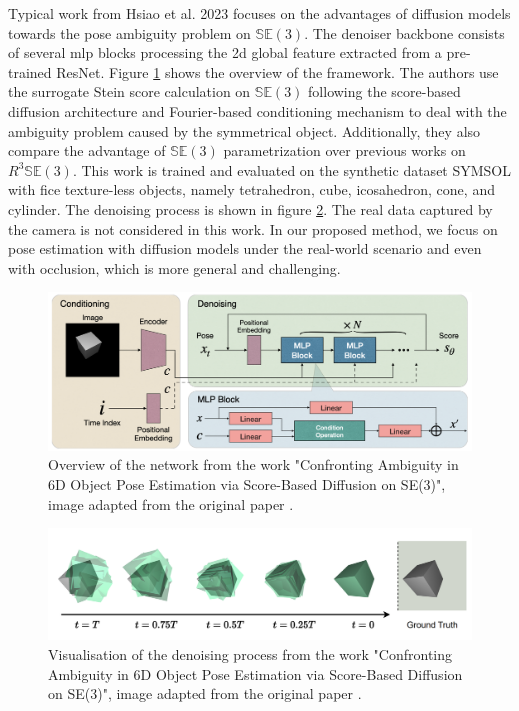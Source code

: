 \documentclass[12pt,DIV14,BCOR12mm,a4paper,footinclude=false,headinclude,parskip=half-,twoside,openright,cleardoublepage=empty,toc=index,bibliography=totoc,listof=totoc]{scrreprt}
\numberwithin{equation}{chapter}
\begin{document}
Typical work from Hsiao et al. 2023 \cite{hsiao2023confronting} focuses on the advantages of diffusion models towards the pose ambiguity problem on $\mathbb{SE}(3)$. The denoiser backbone consists of several \gls{mlp} blocks processing the \gls{2d} global feature extracted from a pre-trained ResNet. Figure \ref{img:confront} shows the overview of the framework. The authors use the surrogate Stein score calculation on $\mathbb{SE}(3)$ following the score-based diffusion architecture and Fourier-based conditioning mechanism to deal with the ambiguity problem caused by the symmetrical object. Additionally, they also compare the advantage of $\mathbb{SE}(3)$ parametrization over previous works on $R^{3}\mathbb{SE}(3)$. This work is trained and evaluated on the synthetic dataset SYMSOL \cite{implicitpdf2021} with fice texture-less objects, namely tetrahedron, cube, icosahedron, cone, and cylinder. The denoising process is shown in figure \ref{img:confront_cube}. The real data captured by the camera is not considered in this work. In our proposed method, we focus on pose estimation with diffusion models under the real-world scenario and even with occlusion, which is more general and challenging.
\begin{figure}[h]
	\centering
	\includegraphics[width=1.\textwidth]{img/confront.png}
	\caption{Overview of the network from the work "Confronting Ambiguity in 6D Object Pose Estimation via Score-Based Diffusion on SE(3)", image adapted from the original paper \cite{hsiao2023confronting}.}
	\label{img:confront}
\end{figure}

\begin{figure}[h]
	\centering
	\includegraphics[width=1.\textwidth]{img/confront_cube.png}
	\caption{Visualisation of the denoising process from the work "Confronting Ambiguity in 6D Object Pose Estimation via Score-Based Diffusion on SE(3)", image adapted from the original paper \cite{hsiao2023confronting}.}
	\label{img:confront_cube}
\end{figure}
\end{document}

